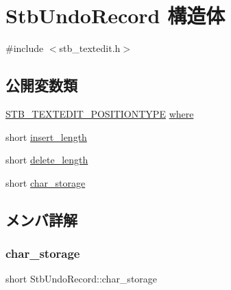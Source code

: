 \hypertarget{struct_stb_undo_record}{}\section{Stb\+Undo\+Record 構造体}
\label{struct_stb_undo_record}


{\ttfamily \#include $<$stb\+\_\+textedit.\+h$>$}

\subsection*{公開変数類}
\begin{DoxyCompactItemize}
\item 
\mbox{\hyperlink{stb__textedit_8h_a5d0c1b8751b6517e3d817f2a025ed654}{S\+T\+B\+\_\+\+T\+E\+X\+T\+E\+D\+I\+T\+\_\+\+P\+O\+S\+I\+T\+I\+O\+N\+T\+Y\+PE}} \mbox{\hyperlink{struct_stb_undo_record_a49e87adbb75a18ffba1f853ac974b31d}{where}}
\item 
short \mbox{\hyperlink{struct_stb_undo_record_ae2a3af79db791549db0c42263407cab5}{insert\+\_\+length}}
\item 
short \mbox{\hyperlink{struct_stb_undo_record_ad81789175cef417a0fe58204277fd735}{delete\+\_\+length}}
\item 
short \mbox{\hyperlink{struct_stb_undo_record_a654ca22cb5021a8ee18ad5f500eb406d}{char\+\_\+storage}}
\end{DoxyCompactItemize}


\subsection{メンバ詳解}
\mbox{\label{struct_stb_undo_record_a654ca22cb5021a8ee18ad5f500eb406d}} 
\subsubsection{\texorpdfstring{char\+\_\+storage}{char\_storage}}
{\footnotesize\ttfamily short Stb\+Undo\+Record\+::char\+\_\+storage}

\mbox{\label{struct_stb_undo_record_ad81789175cef417a0fe58204277fd735}} 
